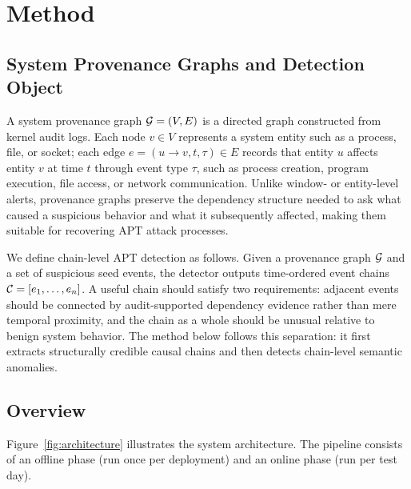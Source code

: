 \section{Method}
\label{sec:method}
\label{sec:design}

\subsection{System Provenance Graphs and Detection Object}
\label{sec:provenance_graph}

A system provenance graph $\mathcal{G}=(V,E)$ is a directed graph constructed from kernel audit logs. Each node $v\in V$ represents a system entity such as a process, file, or socket; each edge $e=(u\rightarrow v,t,\tau)\in E$ records that entity $u$ affects entity $v$ at time $t$ through event type $\tau$, such as process creation, program execution, file access, or network communication. Unlike window- or entity-level alerts, provenance graphs preserve the dependency structure needed to ask what caused a suspicious behavior and what it subsequently affected, making them suitable for recovering APT attack processes.

We define chain-level APT detection as follows. Given a provenance graph $\mathcal{G}$ and a set of suspicious seed events, the detector outputs time-ordered event chains $\mathcal{C}=[e_1,\ldots,e_n]$. A useful chain should satisfy two requirements: adjacent events should be connected by audit-supported dependency evidence rather than mere temporal proximity, and the chain as a whole should be unusual relative to benign system behavior. The method below follows this separation: it first extracts structurally credible causal chains and then detects chain-level semantic anomalies.

\subsection{Overview}



Figure~\ref{fig:architecture} illustrates the system architecture. The pipeline consists of an offline phase (run once per deployment) and an online phase (run per test day).

